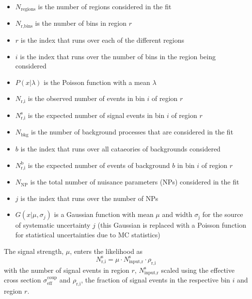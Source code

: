 \begin{itemize}
\item $N_{\text{regions}}$ is the number of regions considered in the fit
\item $N_\text{r,bins}$ is the number of bins in region $r$
\item $r$ is the index that runs over each of the different regions
\item $i$ is the index that runs over the number of bins in the region being considered
\item $P(x|\lambda)$ is the Poisson function with a mean $\lambda$
\item $N_\text{r,i}$ is the observed number of events in bin $i$ of region $r$
\item $N_\text{r,i}^\text{s}$ is the expected number of signal events in bin $i$ of region $r$
\item $N_\text{bkg}$ is the number of background processes that are considered in the fit
\item $b$ is the index that runs over all cataeories of backgrounds considered
\item $N_\text{r,i}^\text{b}$ is the expected number of events of background $b$ in bin $i$ of region $r$
\item $N_\text{NP}$ is the total number of nuisance parameters (NPs) considered in the fit
\item $j$ is the index that runs over the number of NPs
\item $G(x|\mu,\sigma_{j})$ is a Gaussian function with mean $\mu$ and width $\sigma_\text{j}$ for the source of systematic uncertainty $j$ (this Gaussian is replaced with a Poisson function for statistical uncertainties due to MC statistics)
\end{itemize}

The signal strength, $\mu$, enters the likelihood as
\[ N_\text{r,i}^\text{s} = \mu \cdot N_\text{input,r}^\text{s} \cdot \rho_\text{r,i}
\]
with the number of signal events in region $r$, $N_\text{input,r}^\text{s}$ scaled using the effective cross section $\sigma_\text{eff}^\text{coup}$ and $\rho_\text{r,i}$, the fraction of signal events in the respective bin $i$ and region $r$. 


